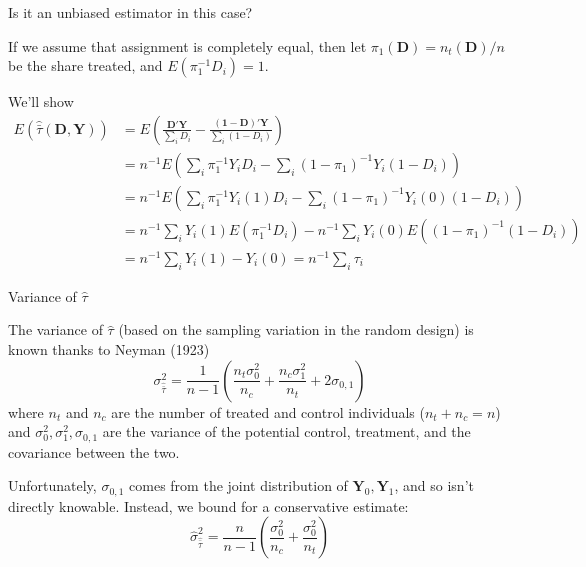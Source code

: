 \documentclass[notes,11pt, aspectratio=169]{beamer}
\newenvironment{wideitemize}{\itemize\addtolength{\itemsep}{10pt}}{\enditemize}
\begin{document}
\begin{frame}
  
  \begin{wideitemize}
  \item Is it an unbiased estimator in this case?
  \item If we assume that assignment is completely equal, then let
    $\pi_{1}(\mathbf{D}) = n_{t}(\mathbf{D})/n$ be the share treated,
    and $E(\pi_{1}^{-1}D_{i}) = 1$.
    \item We'll show 
      \begin{align}
        E(\hat{\bar{\tau}}(\mathbf{D}, \mathbf{Y})) &= E\left(\frac{\mathbf{D}'\mathbf{Y}}{\sum_{i}D_{i}} - \frac{(\mathbf{1}-\mathbf{D})'\mathbf{Y}}{\sum_{i}(1-D_{i})}\right)\\
                                                    &=n^{-1}E\left(\sum_{i}\pi_{1}^{-1}Y_{i}D_{i} - \sum_{i}(1-\pi_{1})^{-1}Y_{i}(1-D_{i})\right)\\
                                                    &=n^{-1}E\left(\sum_{i}\pi_{1}^{-1}Y_{i}(1)D_{i} - \sum_{i}(1-\pi_{1})^{-1}Y_{i}(0)(1-D_{i})\right)\\
                                                    &=n^{-1}\sum_{i}Y_{i}(1)E\left(\pi_{1}^{-1}D_{i}\right) - n^{-1}\sum_{i}Y_{i}(0)E\left((1-\pi_{1})^{-1}(1-D_{i})\right)\\
        &=n^{-1}\sum_{i}Y_{i}(1) - Y_{i}(0) = n^{-1}\sum_{i}\tau_{i}
      \end{align}
    \end{wideitemize}
\end{frame}


\begin{frame}{Variance of $\hat{\tau}$}
  \begin{wideitemize}
  \item The variance of $\hat{\tau}$ (based on the sampling variation
    in the random design) is known thanks to Neyman (1923)
    \begin{equation}
      \sigma^{2}_{\hat{\bar{\tau}}} = \frac{1}{n-1}\left(\frac{n_{t}\sigma^{2}_{0}}{n_{c}} + \frac{n_{c} \sigma^{2}_{1}}{n_{t}} + 2\sigma_{0,1}\right)
    \end{equation}
    where $n_{t}$ and $n_{c}$ are the number of treated and control
    individuals ($n_{t} + n_{c} = n$) and
    $\sigma^{2}_{0}, \sigma^{2}_{1}, \sigma_{0,1}$ are the variance of
    the potential control, treatment, and the covariance between the
    two.
  \item Unfortunately, $\sigma_{0,1}$ comes from the joint
    distribution of $\mathbf{Y}_{0}, \mathbf{Y}_{1}$, and so isn't
    directly knowable. Instead, we bound for a conservative estimate:
    \begin{equation}
      \hat{\sigma}^{2}_{\hat{\bar{\tau}}} = \frac{n}{n-1}\left(\frac{\sigma^{2}_{0}}{n_{c}} + \frac{\sigma^{2}_{0}}{n_{t}}\right)
    \end{equation}
  \end{wideitemize}
\end{frame}
\end{document}
